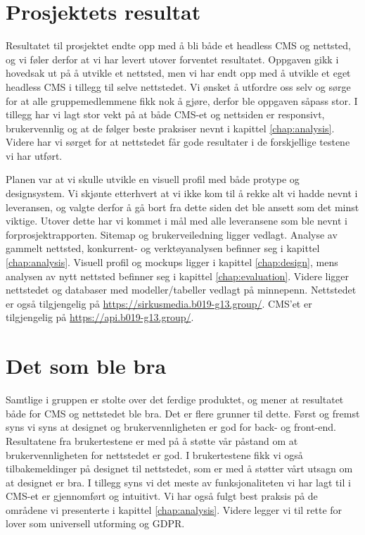 \section{Prosjektets resultat}
Resultatet til prosjektet endte opp med å bli både et headless CMS og nettsted, og vi føler derfor at vi har levert utover forventet resultatet. Oppgaven gikk i hovedsak ut på å utvikle et nettsted, men vi har endt opp med å utvikle et eget headless CMS i tillegg til selve nettstedet. Vi ønsket å utfordre oss selv og sørge for at alle gruppemedlemmene fikk nok å gjøre, derfor ble oppgaven såpass stor. I tillegg har vi lagt stor vekt på at både CMS-et og nettsiden er responsivt, brukervennlig og at de følger beste praksiser nevnt i kapittel \ref{chap:analysis}. Videre har vi sørget for at nettstedet får gode resultater i de forskjellige testene vi har utført.

Planen var at vi skulle utvikle en visuell profil med både protype og designsystem. Vi skjønte etterhvert at vi ikke kom til å rekke alt vi hadde nevnt i leveransen, og valgte derfor å gå bort fra dette siden det ble ansett som det minst viktige. Utover dette har vi kommet i mål med alle leveransene som ble nevnt i forprosjektrapporten. Sitemap og brukerveiledning ligger vedlagt. Analyse av gammelt nettsted, konkurrent- og verktøyanalysen befinner seg i kapittel \ref{chap:analysis}. Visuell profil og mockups ligger i kapittel \ref{chap:design}, mens analysen av nytt nettsted befinner seg i kapittel \ref{chap:evaluation}. Videre ligger nettstedet og databaser med modeller/tabeller vedlagt på minnepenn. Nettstedet er også tilgjengelig på \url{https://sirkusmedia.b019-g13.group/}. CMS'et er tilgjengelig på \url{https://api.b019-g13.group/}.

\section{Det som ble bra}
Samtlige i gruppen er stolte over det ferdige produktet, og mener at resultatet både for CMS og nettstedet ble bra. Det er flere grunner til dette. Først og fremst syns vi syns at designet og brukervennligheten er god for back- og front-end. Resultatene fra brukertestene er med på å støtte vår påstand om at brukervennligheten for nettstedet er god. I brukertestene fikk vi også tilbakemeldinger på designet til nettstedet, som er med å støtter vårt utsagn om at designet er bra. I tillegg syns vi det meste av funksjonaliteten vi har lagt til i CMS-et er gjennomført og intuitivt. Vi har også fulgt best praksis på de områdene vi presenterte i kapittel \ref{chap:analysis}. Videre legger vi til rette for lover som universell utforming og GDPR. 

